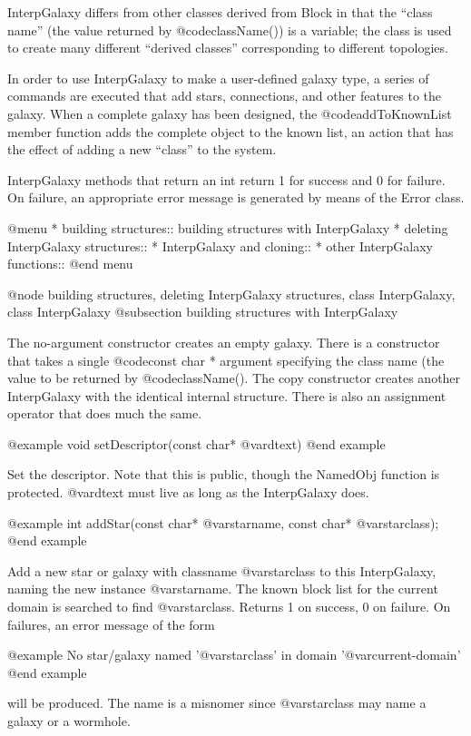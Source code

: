 InterpGalaxy differs from other classes derived from Block in that
the ``class name'' (the value returned by @code{className()}) is a
variable; the class is used to create many different ``derived classes''
corresponding to different topologies.

In order to use InterpGalaxy to make a user-defined galaxy type,
a series of commands are executed that add stars, connections, and
other features to the galaxy.  When a complete galaxy has been
designed, the @code{addToKnownList} member function adds the complete
object to the known list, an action that has the effect of adding a
new ``class'' to the system.

InterpGalaxy methods that return an int return 1 for success and 0
for failure.  On failure, an appropriate error message is generated
by means of the Error class.


@menu
* building structures::         building structures with InterpGalaxy
* deleting InterpGalaxy structures::
* InterpGalaxy and cloning::
* other InterpGalaxy functions::
@end menu

@node building structures, deleting InterpGalaxy structures, class InterpGalaxy, class InterpGalaxy
@subsection building structures with InterpGalaxy

The no-argument constructor creates an empty galaxy.  There is a
constructor that takes a single @code{const char *} argument
specifying the class name (the value to be returned by @code{className()}.
The copy constructor creates another InterpGalaxy with the identical
internal structure.  There is also an assignment operator that does
much the same.

@example
void setDescriptor(const char* @var{dtext})
@end example

Set the descriptor.  Note that this is public, though the NamedObj
function is protected. @var{dtext} must live as long as the InterpGalaxy
does.

@example
int addStar(const char* @var{starname}, const char* @var{starclass});
@end example

Add a new star or galaxy with classname @var{starclass} to this
InterpGalaxy, naming the new instance @var{starname}.  The known block
list for the current domain is searched to find @var{starclass}.
Returns 1 on success, 0 on failure.  On failures, an error message
of the form

@example
No star/galaxy named '@var{starclass}' in domain '@var{current-domain}'
@end example

will be produced.  The name is a misnomer since @var{starclass} may
name a galaxy or a wormhole.

